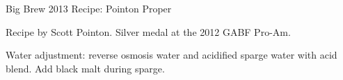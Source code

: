 \begin{recipe}{Big Brew 2013 Recipe: Pointon Proper} %

\begin{aboutblock}
Recipe by Scott Pointon. Silver medal at the 2012 GABF Pro-Am. \sourceaha
\end{aboutblock}


\begin{methodandtiming}

\begin{mashsteps}
\end{mashsteps}

\begin{fermentationsteps}
\end{fermentationsteps}

\begin{directions}
Water adjustment: reverse osmosis water and acidified sparge water with
 acid blend. Add black malt during sparge.
\end{directions}

\end{methodandtiming}

\recipebreak

\begin{ingredientsblock}

\begin{malts}
\end{malts}

\begin{hops}
\end{hops}


\end{ingredientsblock}

\end{recipe}

